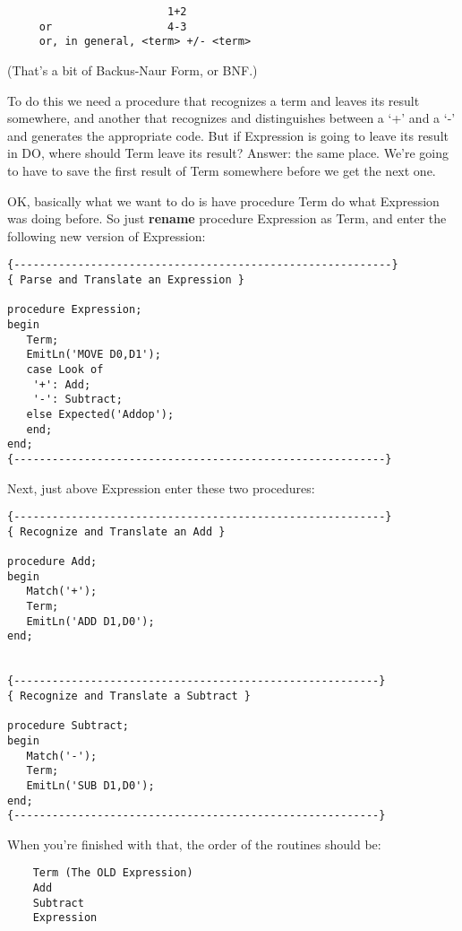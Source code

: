 \begin{verbatim}
                         1+2
     or                  4-3
     or, in general, <term> +/- <term>
\end{verbatim}

(That's a bit of Backus-Naur Form, or BNF.)

To do this we need a procedure that recognizes a term  and leaves its   result   somewhere, and  another   that   recognizes   and distinguishes  between   a  `+'  and  a  `-'  and  generates  the appropriate code. But if Expression is going to leave its result in DO, where should Term leave its result?    Answer:    the same place. We're  going  to  have  to  save the first result of Term somewhere before we get the next one.

OK, basically what we want to  do  is have procedure Term do what Expression was doing before. So just {\bfseries rename} procedure Expression as Term, and enter the following new version of Expression:

\begin{verbatim}
{-----------------------------------------------------------}
{ Parse and Translate an Expression }

procedure Expression;
begin
   Term;
   EmitLn('MOVE D0,D1');
   case Look of
    '+': Add;
    '-': Subtract;
   else Expected('Addop');
   end;
end;
{----------------------------------------------------------}
\end{verbatim}

Next, just above Expression enter these two procedures:

\begin{verbatim}
{----------------------------------------------------------}
{ Recognize and Translate an Add }

procedure Add;
begin
   Match('+');
   Term;
   EmitLn('ADD D1,D0');
end;


{---------------------------------------------------------}
{ Recognize and Translate a Subtract }

procedure Subtract;
begin
   Match('-');
   Term;
   EmitLn('SUB D1,D0');
end;
{---------------------------------------------------------}
\end{verbatim}

When you're finished with that, the order of the routines should be:

\begin{verbatim}
	Term (The OLD Expression)
	Add
	Subtract
	Expression
\end{verbatim}

